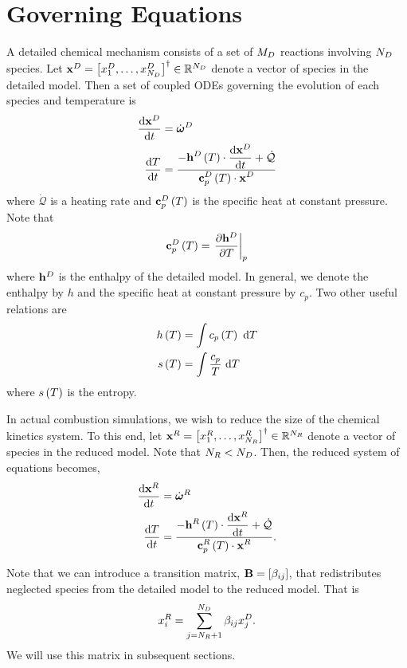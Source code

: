 \section{Governing Equations}
A detailed chemical mechanism consists of a set of $M_{D}$ reactions involving $N_{D}$ species.  
Let $\mathbf{x}^{D} = \left[x_{1}^{D}, \ldots, x_{N_{D}}^{D}\right]^{\dagger} \in \mathbb{R}^{N_{D}}$ denote 
a vector of species in the detailed model.  Then a set of coupled ODEs governing the evolution 
of each species and temperature is
\begin{align}
  \frac{\mathrm{d} \mathbf{x}^{D}}{\mathrm{d} t} &= \dot{\boldsymbol{\omega}}^{D} \\
  \frac{\mathrm{d} T}{\mathrm{d} t}   &= \frac{\displaystyle -\mathbf{h}^{D}\left(T\right)\cdot\frac{\mathrm{d} \mathbf{x}^{D}}{\mathrm{d} t} + \dot{\mathcal{Q}}}{\displaystyle \mathbf{c}_{p}^{D}\left(T\right)\cdot\mathbf{x}^{D}}
\end{align}
where $\dot{\mathcal{Q}}$ is a heating rate and $\mathbf{c}_{p}^{D}\left(T\right)$ is the specific heat at constant 
pressure.  Note that
\begin{align}
  \mathbf{c}_{p}^{D}\left(T\right) = \left.\frac{\partial \mathbf{h}^{D}}{\partial T}\right|_{p}
\end{align}
where $\mathbf{h}^{D}$ is the enthalpy of the detailed model.  In general, we denote the enthalpy by $h$ 
and the specific heat at constant pressure by $c_{p}$.
Two other useful relations are
\begin{align}
  h\left(T\right) &= \int{c_{p}\left(T\right) \ \mathrm{d}T} \label{eq:h_cp_rel} \\
  s\left(T\right) &= \int{\frac{c_{p}}{T} \ \mathrm{d}T} \label{eq:s_cp_rel}
\end{align}
where $s\left(T\right)$ is the entropy.

In actual combustion simulations, we wish to reduce the size of the chemical kinetics system.  
To this end, let $\mathbf{x}^{R} = \left[x_{1}^{R}, \ldots, x_{N_{R}}^{R}\right]^{\dagger} \in \mathbb{R}^{N_{R}}$ 
denote a vector of species in the reduced model.  Note that $N_{R} < N_{D}$.  Then, the reduced 
system of equations becomes,
\begin{align}
  \frac{\mathrm{d} \mathbf{x}^{R}}{\mathrm{d} t} &= \dot{\boldsymbol{\omega}}^{R} \label{eq:reduced}\\
  \frac{\mathrm{d} T}{\mathrm{d} t}   &= \frac{\displaystyle -\mathbf{h}^{R}\left(T\right)\cdot\frac{\mathrm{d} \mathbf{x}^{R}}{\mathrm{d} t} + \dot{\mathcal{Q}}}{\displaystyle \mathbf{c}_{p}^{R}\left(T\right)\cdot\mathbf{x}^{R}}. \label{eq:reduced_T}
\end{align}

Note that we can introduce a transition matrix, $\mathbf{B} = \left[\beta_{ij}\right]$, that 
redistributes neglected species from the detailed model to the reduced model.  That is
\begin{align}
  x_{i}^{R} = \sum_{j=N_{R} + 1}^{N_{D}}{\beta_{ij}x_{j}^{D}}. \label{eq:transition}
\end{align}
We will use this matrix in subsequent sections.
